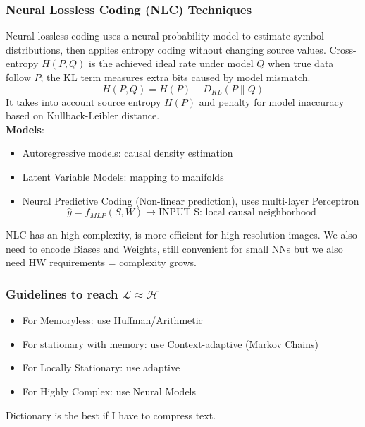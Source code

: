 \subsubsection{Neural Lossless Coding (NLC) Techniques}
Neural lossless coding uses a neural probability model to estimate symbol distributions, then applies entropy coding without changing source values. Cross-entropy $H(P,Q)$ is the achieved ideal rate under model $Q$ when true data follow $P$; the KL term measures extra bits caused by model mismatch.
$$H(P,Q) = H(P) + D_{KL}(P\parallel Q)$$
It takes into account source entropy $H(P)$ and penalty for model inaccuracy based on Kullback-Leibler distance.\\%
\textbf{Models}:
\begin{itemize}
    \item Autoregressive models: causal density estimation
    \item Latent Variable Models: mapping to manifolds
    \item Neural Predictive Coding (Non-linear prediction), uses multi-layer Perceptron
    $$\hat{y} = f_{MLP}(S,W)\to \text{INPUT S: local causal neighborhood}$$
\end{itemize}
NLC has an high complexity, is more efficient for high-resolution images. We also need to encode Biases and Weights, still convenient for small NNs but we also need HW requirements = complexity grows.
\subsubsection{Guidelines to reach $\mathcal{L} \approx \mathcal{H}$}
\begin{itemize}
    \item For Memoryless: use Huffman/Arithmetic
    \item For stationary with memory: use Context-adaptive (Markov Chains)
    \item For Locally Stationary: use adaptive
    \item For Highly Complex: use Neural Models
\end{itemize}
Dictionary is the best if I have to compress text.
